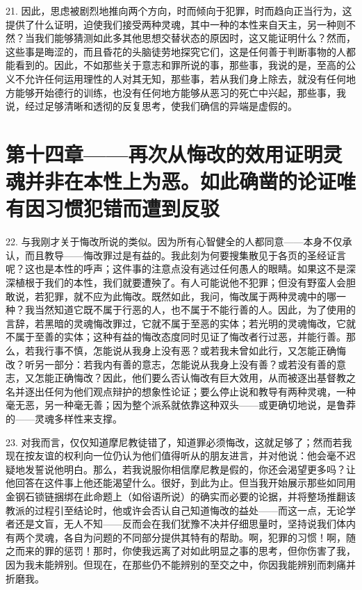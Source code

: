 21. 因此，思虑被剧烈地推向两个方向，时而倾向于犯罪，时而趋向正当行为，这提供了什么证明，迫使我们接受两种灵魂，其中一种的本性来自天主，另一种则不然？当我们能够猜测如此多其他思想交替状态的原因时，这又能证明什么？然而，这些事是晦涩的，而且昏花的头脑徒劳地探究它们，这是任何善于判断事物的人都能看到的。因此，不如那些关于意志和罪所说的事，那些事，我说的是，至高的公义不允许任何运用理性的人对其无知，那些事，若从我们身上除去，就没有任何地方能够开始德行的训练，也没有任何地方能够从恶习的死亡中兴起，那些事，我说，经过足够清晰和透彻的反复思考，使我们确信的异端是虚假的。\par


\section{第十四章——再次从悔改的效用证明灵魂并非在本性上为恶。如此确凿的论证唯有因习惯犯错而遭到反驳}

22. 与我刚才关于悔改所说的类似。因为所有心智健全的人都同意——本身不仅承认，而且教导——悔改罪过是有益的。我此刻为何要搜集散见于各页的圣经证言呢？这也是本性的呼声；这件事的注意点没有逃过任何愚人的眼睛。如果这不是深深植根于我们的本性，我们就要遭殃了。有人可能说他不犯罪；但没有野蛮人会胆敢说，若犯罪，就不应为此悔改。既然如此，我问，悔改属于两种灵魂中的哪一种？我当然知道它既不属于行恶的人，也不属于不能行善的人。因此，为了使用的言辞，若黑暗的灵魂悔改罪过，它就不属于至恶的实体；若光明的灵魂悔改，它就不属于至善的实体；这种有益的悔改态度同时见证了悔改者行过恶，并能行善。那么，若我行事不慎，怎能说从我身上没有恶？或若我未曾如此行，又怎能正确悔改？听另一部分：若我内有善的意志，怎能说从我身上没有善？或若没有善的意志，又怎能正确悔改？因此，他们要么否认悔改有巨大效用，从而被逐出基督教之名并逐出任何为他们观点辩护的想象性论证；要么停止说和教导有两种灵魂，一种毫无恶，另一种毫无善；因为整个派系就依靠这种双头——或更确切地说，是鲁莽的——灵魂多样性来支撑。\par

23. 对我而言，仅仅知道摩尼教徒错了，知道罪必须悔改，这就足够了；然而若我现在按友谊的权利向一位仍认为他们值得听从的朋友进言，并对他说：他会毫不迟疑地发誓说他明白。那么，若我说服你相信摩尼教是假的，你还会渴望更多吗？让他回答在这件事上他还能渴望什么。很好，到此为止。但当我开始展示那些如同用金钢石锁链捆绑在此命题上（如俗语所说）的确实而必要的论据，并将整场推翻该教派的过程引至结论时，他或许会否认自己知道悔改的益处——而这一点，无论学者还是文盲，无人不知——反而会在我们犹豫不决并仔细思量时，坚持说我们体内有两个灵魂，各自为问题的不同部分提供其特有的帮助。啊，犯罪的习惯！啊，随之而来的罪的惩罚！那时，你使我远离了对如此明显之事的思考，但你伤害了我，因为我未能辨别。但现在，在那些仍不能辨别的至交之中，你因我能辨别而刺痛并折磨我。\par

